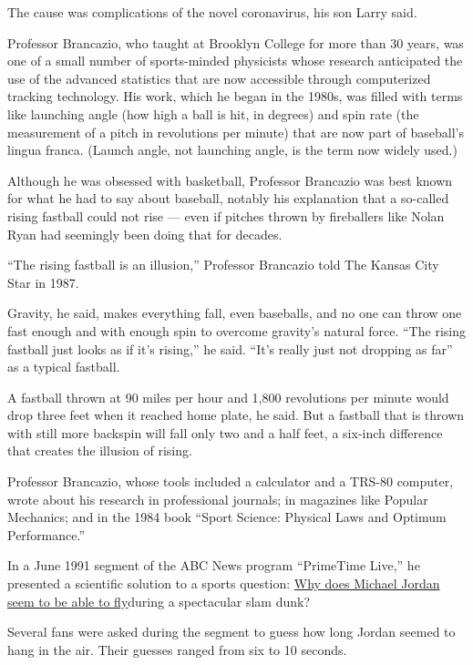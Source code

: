 The cause was complications of the novel coronavirus, his son Larry
said.

Professor Brancazio, who taught at Brooklyn College for more than 30
years, was one of a small number of sports-minded physicists whose
research anticipated the use of the advanced statistics that are now
accessible through computerized tracking technology. His work, which he
began in the 1980s, was filled with terms like launching angle (how high
a ball is hit, in degrees) and spin rate (the measurement of a pitch in
revolutions per minute) that are now part of baseball's lingua franca.
(Launch angle, not launching angle, is the term now widely used.)

Although he was obsessed with basketball, Professor Brancazio was best
known for what he had to say about baseball, notably his explanation
that a so-called rising fastball could not rise --- even if pitches
thrown by fireballers like Nolan Ryan had seemingly been doing that for
decades.

``The rising fastball is an illusion,'' Professor Brancazio told The
Kansas City Star in 1987.

Gravity, he said, makes everything fall, even baseballs, and no one can
throw one fast enough and with enough spin to overcome gravity's natural
force. ``The rising fastball just looks as if it's rising,'' he said.
``It's really just not dropping as far'' as a typical fastball.

A fastball thrown at 90 miles per hour and 1,800 revolutions per minute
would drop three feet when it reached home plate, he said. But a
fastball that is thrown with still more backspin will fall only two and
a half feet, a six-inch difference that creates the illusion of rising.

Professor Brancazio, whose tools included a calculator and a TRS-80
computer, wrote about his research in professional journals; in
magazines like Popular Mechanics; and in the 1984 book ``Sport Science:
Physical Laws and Optimum Performance.''

In a June 1991 segment of the ABC News program ``PrimeTime Live,'' he
presented a scientific solution to a sports question:
\href{https://www.scienceabc.com/pure-sciences/secret-michael-jordan-slam-dunks-basketball-math-physics-hang-time-jump.html}{Why
does Michael Jordan seem to be able to fly}during a spectacular slam
dunk?

Several fans were asked during the segment to guess how long Jordan
seemed to hang in the air. Their guesses ranged from six to 10 seconds.

